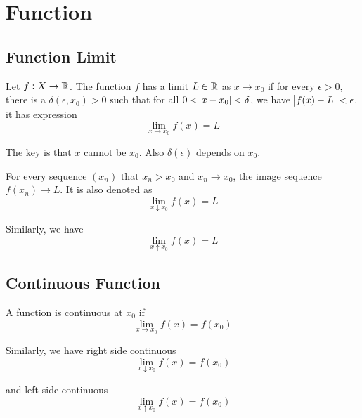 \chapter{Function}

\section{Function Limit}

\begin{definition}
    Let $f: X \rightarrow \mathbb{R}$. The function $f$ has a limit $L\in \mathbb{R}$ as $x \rightarrow x_0$ if for every $\epsilon > 0$, there is a $\delta(\epsilon, x_0) > 0$ such that for all $0 < \abs{x - x_0} < \delta$, we have $\abs{f(x) - L} < \epsilon$. it has expression
    \begin{equation}
        \lim_{x \rightarrow x_0} f(x) = L
    \end{equation}
    
    The key is that $x$ cannot be $x_0$. Also $\delta(\epsilon)$ depends on $x_0$.
    
\end{definition}

\begin{definition}
    For every sequence $(x_n)$ that $x_n > x_0$ and $x_n \rightarrow x_0$, the image sequence $f(x_n) \rightarrow L$. It is also denoted as
    \begin{equation}
        \lim_{x \downarrow x_0} f(x) = L
    \end{equation}
    
    Similarly, we have 
    \begin{equation}
        \lim_{x \uparrow x_0} f(x) = L
    \end{equation}
\end{definition}


\section{Continuous Function}
\begin{definition}\label{continuous_function_definition}
    A function is continuous at $x_0$ if 
    \begin{equation}
        \lim_{x \rightarrow x_0} f(x) = f(x_0)
    \end{equation}
    
    Similarly, we have right side continuous 
    \begin{equation}
        \lim_{x \downarrow x_0} f(x) = f(x_0)
    \end{equation}
    
    and left side continuous
    \begin{equation}
        \lim_{x \uparrow x_0} f(x) = f(x_0)
    \end{equation}
\end{definition}

